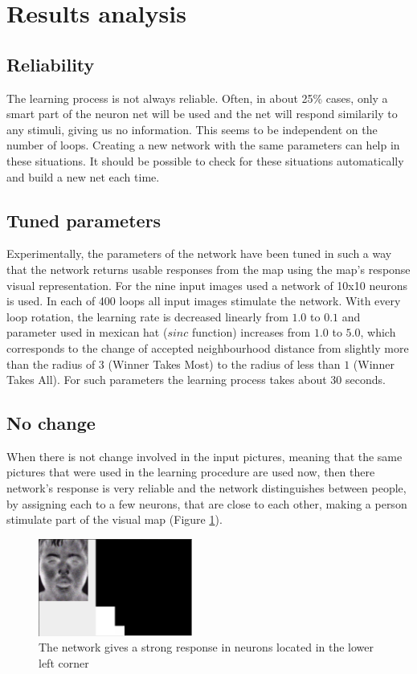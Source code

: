 \documentclass[pdftex]{article}
\begin{document}
\section{Results analysis}
\subsection{Reliability}
The learning process is not always reliable. Often, in about 25\% cases, only a smart part of the neuron net will be used and the net will respond similarily to any stimuli, giving us no information. This seems to be independent on the number of loops. Creating a new network with the same parameters can help in these situations. It should be possible to check for these situations automatically and build a new net each time.
 
\subsection{Tuned parameters}
Experimentally, the parameters of the network have been tuned in such a way that the network returns usable responses from the map using the map's response visual representation. For the nine input images used a network of 10x10 neurons is used. In each of 400 loops all input images stimulate the network. With every loop rotation, the learning rate is decreased linearly from $1.0$ to $0.1$ and parameter used in mexican hat ($sinc$ function) increases from $1.0$ to $5.0$, which corresponds to the change of accepted neighbourhood distance from slightly more than the radius of $3$ (Winner Takes Most) to the radius of less than $1$ (Winner Takes All). For such parameters the learning process takes about 30 seconds.

\subsection{No change}
When there is not change involved in the input pictures, meaning that the same pictures that were used in the learning procedure are used now, then there network's response is very reliable and the network distinguishes between people, by assigning each to a few  neurons, that are close to each other, making a person stimulate part of the visual map (Figure \ref{nochange}). 

\begin{figure}[!htb]
	\centering
	\includegraphics[width=0.45\textwidth]{pictures/nochange.png} 
	\caption{The network gives a strong response in neurons located in the lower left corner}
	\label{nochange}
\end{figure}
\end{document}
